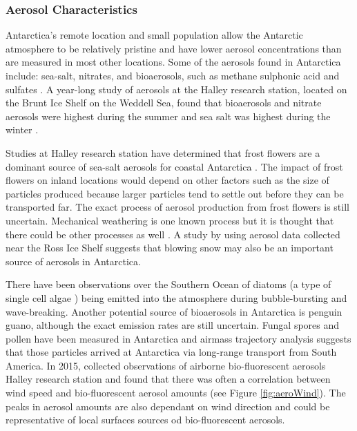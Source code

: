 \subsubsection{Aerosol Characteristics}
Antarctica's remote location and small population allow the Antarctic atmosphere to be relatively pristine and have lower aerosol concentrations than are measured in most other locations. Some of the aerosols found in Antarctica include: sea-salt, nitrates, and bioaerosols, such as methane sulphonic acid and sulfates \citep{rank2003,asmi2010,craw2017}. A year-long study of aerosols at the Halley research station, located on the Brunt Ice Shelf on the Weddell Sea, found that bioaerosols and nitrate aerosols were highest during the summer and sea salt was highest during the winter \citep{rank2003}.

Studies at Halley research station have determined that frost flowers are a dominant source of sea-salt aerosols for coastal Antarctica \citep[e.g.][]{rank2000, rank2003}. The impact of frost flowers on inland locations would depend on other factors such as the size of particles produced because larger particles tend to settle out before they can be transported far. The exact process of aerosol production from frost flowers is still uncertain. Mechanical weathering is one known process but it is thought that there could be other processes as well \citep{rank2003, xu2013}. A study by \cite{gior2018} using aerosol data collected near the Ross Ice Shelf suggests that blowing snow may also be an important source of aerosols in Antarctica.

There have been observations over the Southern Ocean of diatoms (a type of single cell algae \citep{saba2009}) being emitted into the atmosphere during bubble-bursting and wave-breaking. Another potential source of bioaerosols in Antarctica is penguin guano, although the exact emission rates are still uncertain. Fungal spores and pollen have been measured in Antarctica and airmass trajectory analysis suggests that those particles arrived at Antarctica via long-range transport from South America. \citep{craw2017} In 2015, \cite{craw2017} collected observations of airborne bio-fluorescent aerosols Halley research station and found that there was often a correlation between wind speed and bio-fluorescent aerosol amounts (see Figure \ref{fig:aeroWind}). The peaks in aerosol amounts are also dependant on wind direction and could be representative of local surfaces sources od bio-fluorescent aerosols. 

